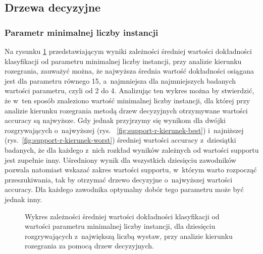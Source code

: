 \documentclass[a4paper,twoside,12pt]{book}
\begin{document}
\subsection{Drzewa decyzyjne}
\subsubsection{Parametr minimalnej liczby instancji}

Na rysunku \ref{fig:support-r-kierunek} przedstawiającym wyniki zależności średniej wartości dokładności klasyfikacji od parametru minimalnej liczby instancji, przy analizie kierunku rozegrania, zauważyć można, że najwyższa średnia wartość dokładności osiągana jest dla parametru równego 15, a~najmniejsza dla najmniejszych badanych wartości parametru, czyli od 2 do 4. Analizując ten wykres można by stwierdzić, że w~ten sposób znaleziono wartość minimalnej liczby instancji, dla której przy analizie kierunku rozegrania metodą drzew decyzyjnych otrzymywane wartości accuracy są najwyższe. Gdy jednak przyjrzymy się wynikom dla dwójki rozgrywających o~najwyższej (rys.~ \ref{fig:support-r-kierunek-best}) i~najniższej (rys.~\ref{fig:support-r-kierunek-worst}) średniej wartości accuracy z~dziesiątki badanych, że dla każdego z~nich rozkład wyników zależnych od wartości supportu jest zupełnie inny. Uśredniony wynik dla wszystkich dziesięciu zawodników pozwala natomiast wskazać zakres wartości supportu, w~którym warto rozpocząć przeszukiwania, tak by otrzymać drzewo decyzyjne o~najwyższej wartości accuracy. Dla każdego zawodnika optymalny dobór tego parametru może być jednak inny. 

\begin{figure}
\centering
{}
\caption{Wykres zależności średniej wartości dokładności klasyfikacji od wartości parametru minimalnej liczby instancji, dla dziesięciu rozgrywających z~największą liczbą wystaw, przy analizie kierunku rozegrania za pomocą drzew decyzyjnych.}
\label{fig:support-r-kierunek}
\end{figure}
\end{document}
